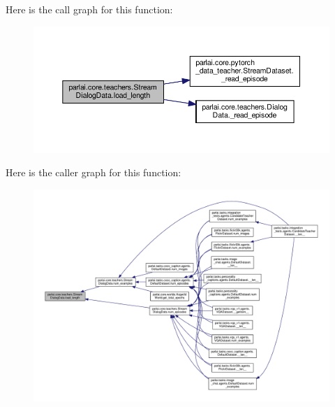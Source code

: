 Here is the call graph for this function\+:
\nopagebreak
\begin{figure}[H]
\begin{center}
\leavevmode
\includegraphics[width=350pt]{classparlai_1_1core_1_1teachers_1_1StreamDialogData_a5f3e6484038cefcc177a635148f0b492_cgraph}
\end{center}
\end{figure}
Here is the caller graph for this function\+:
\nopagebreak
\begin{figure}[H]
\begin{center}
\leavevmode
\includegraphics[width=350pt]{classparlai_1_1core_1_1teachers_1_1StreamDialogData_a5f3e6484038cefcc177a635148f0b492_icgraph}
\end{center}
\end{figure}
\mbox{\label{classparlai_1_1core_1_1teachers_1_1StreamDialogData_a05f4816d029700a4bf9fd1eeafcb527c}} 
